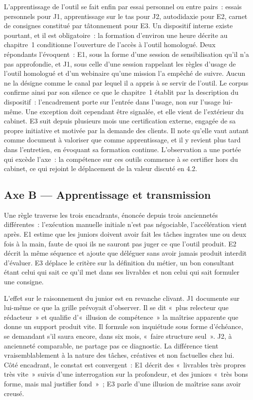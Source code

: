L'apprentissage de l'outil se fait enfin par essai personnel ou entre pairs~: essais
personnels pour J1, apprentissage sur le tas pour J2, autodidaxie pour E2, carnet de
consignes constitué par tâtonnement pour E3. Un dispositif interne existe pourtant, et il
est obligatoire~: la formation d'environ une heure décrite au chapitre~1 conditionne
l'ouverture de l'accès à l'outil homologué. Deux répondants l'évoquent~: E1, sous la forme
d'une session de sensibilisation qu'il n'a pas approfondie, et J1, sous celle d'une session
rappelant les règles d'usage de l'outil homologué et d'un webinaire qu'une mission l'a
empêché de suivre. Aucun ne la désigne comme le canal par lequel il a appris à se servir de
l'outil. Le corpus confirme ainsi par son silence ce que le chapitre~1 établit par la
description du dispositif~: l'encadrement porte sur l'entrée dans l'usage, non sur l'usage
lui-même. Une exception doit cependant être signalée, et elle vient de l'extérieur du
cabinet. E3 suit depuis plusieurs mois une certification externe, engagée de sa propre
initiative et motivée par la demande des clients. Il note qu'elle vaut autant comme document
à valoriser que comme apprentissage, et il y revient plus tard dans l'entretien, en évoquant
sa formation continue.
L'observation a une portée qui excède l'axe~: la compétence sur ces outils commence à se
certifier hors du cabinet, ce qui rejoint le déplacement de la valeur discuté en 4.2.

\subsection{Axe B --- Apprentissage et transmission}

Une règle traverse les trois encadrants, énoncée depuis trois anciennetés différentes~:
l'exécution manuelle initiale n'est pas négociable, l'accélération vient après. E1 estime que
les juniors doivent avoir fait les tâches ingrates une ou deux fois à la main, faute de quoi
ils ne sauront pas juger ce que l'outil produit. E2 décrit la même séquence et ajoute que
déléguer sans avoir jamais produit interdit d'évaluer. E3 déplace le critère sur la
définition du métier, un bon consultant étant celui qui sait ce qu'il met dans ses livrables
et non celui qui sait formuler une consigne.

L'effet sur le raisonnement du junior est en revanche clivant. J1 documente sur lui-même ce
que la grille prévoyait d'observer. Il se dit «~plus relecteur que rédacteur~» et qualifie
d'«~illusion de compétence~» la maîtrise apparente que donne un support produit vite. Il
formule son inquiétude sous forme d'échéance, se demandant s'il saura encore, dans six mois,
«~faire structure seul~». J2, à ancienneté comparable, ne partage pas ce diagnostic. La
différence tient vraisemblablement à la nature des tâches, créatives et non factuelles chez
lui. 
Côté encadrant, le constat est convergent~: E1 décrit des «~livrables très propres très vite~»
suivis d'une interrogation sur la profondeur, et des juniors «~très bons forme, mais mal
justifier fond~»~; E3 parle d'une illusion de maîtrise sans avoir creusé.

